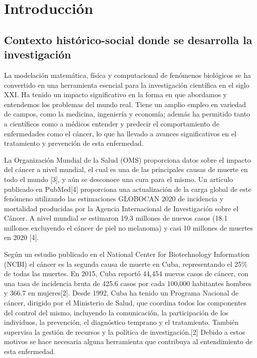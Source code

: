 \chapter*{Introducción}\label{chapter:introduction}

\section{Contexto hist\'orico-social donde se desarrolla la investigaci\'on}
\hspace{.1cm}La modelación matemática, física y computacional de fenómenos biológicos se ha convertido en una herramienta esencial para la investigación científica en el siglo XXI. Ha tenido un impacto significativo en la forma en que abordamos y entendemos los problemas del mundo real. Tiene un amplio empleo en variedad de campos, como la medicina, ingeniería y economía; además ha permitido tanto a científicos como a médicos entender y predecir el comportamiento de enfermedades como el cáncer, lo que ha llevado a avances significativos en el tratamiento y prevención de esta enfermedad.

\hspace{.1cm}La Organización Mundial de la Salud (OMS) proporciona datos sobre el impacto del cáncer a nivel mundial, el cual es una de las principales causas de muerte en todo el mundo [3], y aún se desconoce una cura para el mismo. Un artículo publicado en PubMed[4] proporciona una actualización de la carga global de este fen\'omeno utilizando las estimaciones GLOBOCAN 2020 de incidencia y mortalidad producidas por la Agencia Internacional de Investigación sobre el Cáncer. A nivel mundial se estimaron 19.3 millones de nuevos casos (18.1 millones excluyendo el cáncer de piel no melanoma) y casi 10 millones de muertes en 2020 [4].

\hspace{.1cm}Según un estudio publicado en el National Center for Biotechnology Information (NCBI) el cáncer es la segunda causa de muerte en Cuba, representando el 25\% de todas las muertes. En 2015, Cuba reportó 44,454 nuevos casos de cáncer, con una tasa de incidencia bruta de 425.6 casos por cada 100,000 habitantes hombres y 366.7 en mujeres[2]. Desde 1992, Cuba ha tenido un Programa Nacional de cáncer, dirigido por el Ministerio de Salud, que coordina todos los componentes del control del mismo, incluyendo la comunicación, la participación de los individuos, la prevención, el diagnóstico temprano y el tratamiento. También supervisa la gestión de recursos y la política de investigación.[2] Debido a estos motivos se hace necesaria alguna herramienta que contribuya al entendimiento de esta enfermedad.

